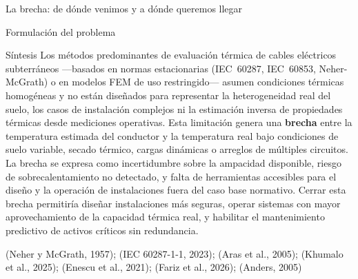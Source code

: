 \documentclass[aspectratio=169]{beamer}
\newcommand{\refcite}[1]{{\footnotesize\color{gray!70!black} #1}}
\begin{document}
\begin{frame}{La brecha: de dónde venimos y a dónde queremos llegar}
\begin{center}
{%
}
\end{center}
\end{frame}

\begin{frame}{Formulación del problema}
\begin{exampleblock}{Síntesis}
\justifying\small
Los métodos predominantes de evaluación térmica de cables eléctricos
subterráneos ---basados en normas estacionarias (IEC~60287, IEC~60853,
Neher-McGrath) o en modelos FEM de uso restringido--- asumen condiciones
térmicas homogéneas y no están diseñados para representar la heterogeneidad
real del suelo, los casos de instalación complejos ni la estimación inversa
de propiedades térmicas desde mediciones operativas. Esta limitación genera
una \textbf{brecha} entre la temperatura estimada del conductor y la
temperatura real bajo condiciones de suelo variable, secado térmico, cargas
dinámicas o arreglos de múltiples circuitos. La brecha se expresa como
incertidumbre sobre la ampacidad disponible, riesgo de sobrecalentamiento
no detectado, y falta de herramientas accesibles para el diseño y la
operación de instalaciones fuera del caso base normativo. Cerrar esta brecha
permitiría diseñar instalaciones más seguras, operar sistemas con mayor
aprovechamiento de la capacidad térmica real, y habilitar el mantenimiento
predictivo de activos críticos sin redundancia.
\end{exampleblock}

\vspace{0.3em}
\refcite{(Neher y McGrath, 1957); (IEC 60287-1-1, 2023); (Aras et al., 2005);
(Khumalo et al., 2025); (Enescu et al., 2021); (Fariz et al., 2026);
(Anders, 2005)}
\end{frame}


\end{document}
